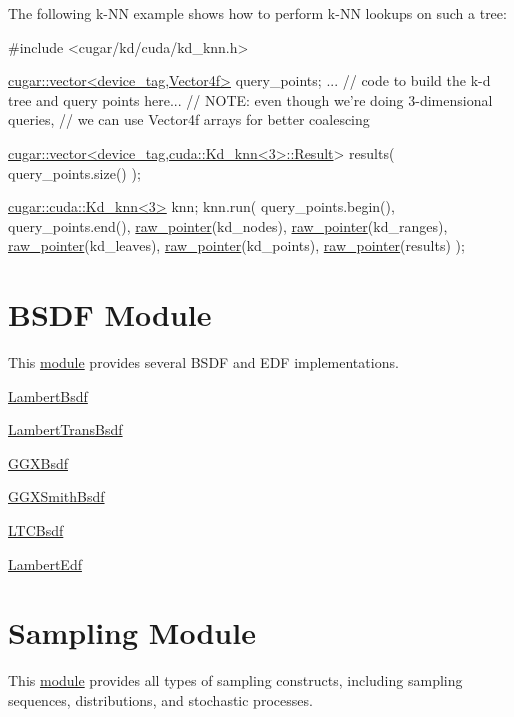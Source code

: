 \begin{DoxyParagraph}{}
The following k-\/\+NN example shows how to perform k-\/\+NN lookups on such a tree\+: 
\begin{DoxyCode}
\textcolor{preprocessor}{#include <cugar/kd/cuda/kd\_knn.h>}

\hyperlink{structcugar_1_1vector}{cugar::vector<device\_tag,Vector4f>} query\_points;
... \textcolor{comment}{// code to build the k-d tree and query points here...}
    \textcolor{comment}{// NOTE: even though we're doing 3-dimensional queries,}
    \textcolor{comment}{// we can use Vector4f arrays for better coalescing}

\hyperlink{structcugar_1_1vector}{cugar::vector<device\_tag,cuda::Kd\_knn<3>::Result}> results( 
      query\_points.size() );

\hyperlink{structcugar_1_1cuda_1_1_kd__knn}{cugar::cuda::Kd\_knn<3>} knn;
knn.run(
    query\_points.begin(),
    query\_points.end(),
    \hyperlink{namespacecugar_a3f6cb2c817f2ba065931cec569aa848b}{raw\_pointer}(kd\_nodes),
    \hyperlink{namespacecugar_a3f6cb2c817f2ba065931cec569aa848b}{raw\_pointer}(kd\_ranges),
    \hyperlink{namespacecugar_a3f6cb2c817f2ba065931cec569aa848b}{raw\_pointer}(kd\_leaves),
    \hyperlink{namespacecugar_a3f6cb2c817f2ba065931cec569aa848b}{raw\_pointer}(kd\_points),
    \hyperlink{namespacecugar_a3f6cb2c817f2ba065931cec569aa848b}{raw\_pointer}(results) );
\end{DoxyCode}
 
\end{DoxyParagraph}
\hypertarget{bsdf_page}{}\section{B\+S\+DF Module}\label{bsdf_page}
This \hyperlink{group___b_s_d_f_module}{module} provides several B\+S\+DF and E\+DF implementations.


\begin{DoxyItemize}
\item \hyperlink{structcugar_1_1_lambert_bsdf}{Lambert\+Bsdf}
\item \hyperlink{structcugar_1_1_lambert_trans_bsdf}{Lambert\+Trans\+Bsdf}
\item \hyperlink{structcugar_1_1_g_g_x_bsdf}{G\+G\+X\+Bsdf}
\item \hyperlink{structcugar_1_1_g_g_x_smith_bsdf}{G\+G\+X\+Smith\+Bsdf}
\item \hyperlink{structcugar_1_1_l_t_c_bsdf}{L\+T\+C\+Bsdf}
\item \hyperlink{structcugar_1_1_lambert_edf}{Lambert\+Edf} 
\end{DoxyItemize}\hypertarget{sampling_page}{}\section{Sampling Module}\label{sampling_page}
\begin{DoxyParagraph}{}
This \hyperlink{group__sampling}{module} provides all types of sampling constructs, including sampling sequences, distributions, and stochastic processes.
\end{DoxyParagraph}

